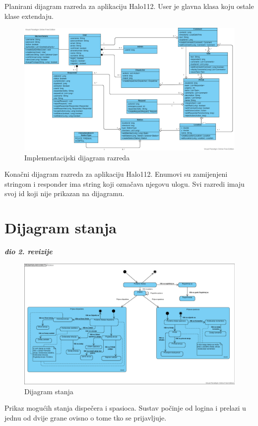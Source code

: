 			Planirani dijagram razreda za aplikaciju Halo112. User je glavna klasa koju ostale klase extendaju.
			
			 \begin{figure}[H]
				\includegraphics[scale=0.3]{slike/classes2.PNG}
				\centering
				\caption{Implementacijski dijagram razreda}
				\label{fig:razredi2}
			\end{figure}
			
			Konačni dijagram razreda za aplikaciju Halo112. Enumovi su zamijenjeni stringom i responder ima string koji označava njegovu ulogu. Svi razredi imaju svoj id koji nije prikazan na dijagramu. 
			\eject
		
		\section{Dijagram stanja}
			
			
			\textbf{\textit{dio 2. revizije}}\\
			
			\begin{figure}[H]
				\includegraphics[scale=0.32]{slike/stanja.PNG}
				\centering
				\caption{Dijagram stanja}
				\label{fig:dijagram_stanja}
			\end{figure}
			Prikaz mogućih stanja dispečera i spasioca. Sustav počinje od logina i prelazi u jednu od dvije grane ovisno o tome tko se prijavljuje.
			
